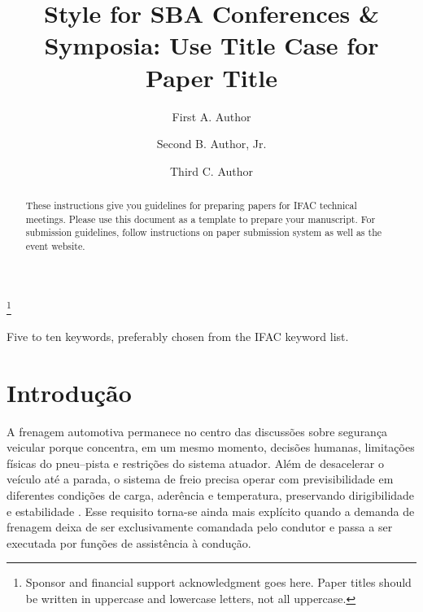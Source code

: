 \documentclass[a4paper]{ifacconf}
\begin{document}
   \begin{frontmatter}

      \title{Style for SBA Conferences \& Symposia: Use Title Case for
         Paper Title}

      \thanks[footnoteinfo]{Sponsor and financial support acknowledgment
         goes here. Paper titles should be written in uppercase and lowercase
         letters, not all uppercase.}

      \author[First]{First A. Author}
      \author[Second]{Second B. Author, Jr.}
      \author[Third]{Third C. Author}


      \address[First]{Faculdade de Engenharia Elétrica, Universidade do Triângulo, MG, (e-mail: autor1@faceg@univt.br).}
      \address[Second]{Faculdade de Engenharia de Controle \& Automação, Universidade do Futuro, RJ (e-mail: autor2@feca.unifutu.rj)}
      \address[Third]{Electrical Engineering Department,
         Seoul National University, Seoul, Korea, (e-mail: author3@snu.ac.kr)}

      \renewcommand{\abstractname}{{\bf Abstract:~}}

      \begin{abstract}                %
         These instructions give you guidelines for preparing papers for IFAC
         technical meetings. Please use this document as a template to prepare
         your manuscript. For submission guidelines, follow instructions on
         paper submission system as well as the event website.
      \end{abstract}

      \begin{keyword}
         Five to ten keywords, preferably chosen from the IFAC keyword list.
      \end{keyword}

   \end{frontmatter}
\fi



\section{Introdução}

A frenagem automotiva permanece no centro das discussões sobre segurança veicular porque concentra, em um mesmo momento, decisões humanas, limitações físicas do pneu--pista e restrições do sistema atuador. Além de desacelerar o veículo até a parada, o sistema de freio precisa operar com previsibilidade em diferentes condições de carga, aderência e temperatura, preservando dirigibilidade e estabilidade \cite{Rudolf2011,Konrad2014}. Esse requisito torna-se ainda mais explícito quando a demanda de frenagem deixa de ser exclusivamente comandada pelo condutor e passa a ser executada por funções de assistência à condução.
\end{document}
